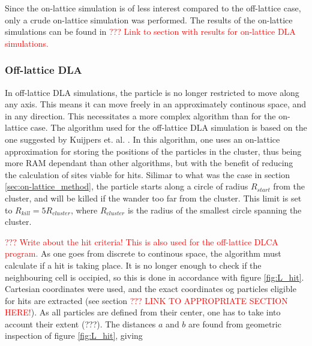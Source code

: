 Since the on-lattice simulation is of less interest compared to the off-lattice case, only a crude on-lattice simulation was performed. The results of the on-lattice simulations can be found in \textcolor{red}{??? Link to section with results for on-lattice DLA simulations. }

\subsubsection{Off-lattice DLA}
In off-lattice DLA simulations, the particle is no longer restricted to move along any axis. This means it can move freely in an approximately continous space, and in any direction. This necessitates a more complex algorithm than for the on-lattice case. The algorithm used for the off-lattice DLA simulation is based on the one suggested by Kuijpers et. al. \cite{Kuijpers2014841}. In this algorithm, one uses an on-lattice approximation for storing the positions of the particles in the cluster, thus being more RAM dependant than other algorithms, but with the benefit of reducing the calculation of sites viable for hits. Silimar to what was the case in section \ref{sec:on-lattice_method}, the particle starts along a circle of radius $R_{start}$ from the cluster, and will be killed if the wander too far from the cluster. This limit is set to $R_{kill} = 5R_{cluster}$, where $R_{cluster}$ is the radius of the smallest circle spanning the cluster.

\textcolor{red}{??? Write about the hit criteria! This is also used for the off-lattice DLCA program.}
As one goes from discrete to continous space, the algorithm must calculate if a hit is taking place. It is no longer enough to check if the neighbouring cell is occipied, so this is done in accordance with figure \ref{fig:L_hit}. Cartesian coordinates were used, and the exact coordinates og particles eligible for hits are extracted (see section \textcolor{red}{??? LINK TO APPROPRIATE SECTION HERE!}). As all particles are defined from their center, one has to take into account their extent (???). The distances $a$ and $b$ are found from geometric inspection of figure \ref{fig:L_hit}, giving

